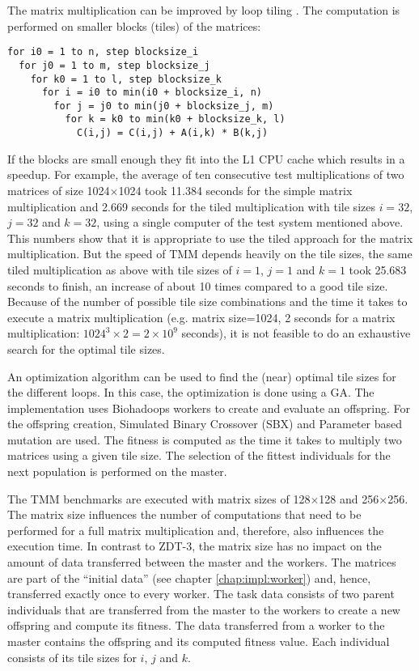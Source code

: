 The matrix multiplication can be improved by loop tiling \cite{wolfe1989more}. The computation is performed on smaller blocks (tiles) of the matrices:
\begin{lstlisting}
for i0 = 1 to n, step blocksize_i
  for j0 = 1 to m, step blocksize_j
    for k0 = 1 to l, step blocksize_k
      for i = i0 to min(i0 + blocksize_i, n)
        for j = j0 to min(j0 + blocksize_j, m)
          for k = k0 to min(k0 + blocksize_k, l)
            C(i,j) = C(i,j) + A(i,k) * B(k,j)
\end{lstlisting}

If the blocks are small enough they fit into the L1 CPU cache which results in a speedup. For example, the average of ten consecutive test multiplications of two matrices of size 1024$\times$1024 took 11.384 seconds for the simple matrix multiplication and 2.669 seconds for the tiled multiplication with tile sizes $i=32$, $j=32$ and $k=32$, using a single computer of the test system mentioned above. This numbers show that it is appropriate to use the tiled approach for the matrix multiplication. But the speed of TMM depends heavily on the tile sizes, the same tiled multiplication as above with tile sizes of $i=1$, $j=1$ and $k=1$ took 25.683 seconds to finish, an increase of about 10 times compared to a good tile size. Because of the number of possible tile size combinations and the time it takes to execute a matrix multiplication (e.g. matrix size=1024, 2 seconds for a matrix multiplication: $1024^3 \times 2 = 2\times{10^9} $ seconds), it is not feasible to do an exhaustive search for the optimal tile sizes.

An optimization algorithm can be used to find the (near) optimal tile sizes for the different loops. In this case, the optimization is done using a GA. The implementation uses Biohadoops workers to create and evaluate an offspring. For the offspring creation, Simulated Binary Crossover (SBX) and Parameter based mutation are used. The fitness is computed as the time it takes to multiply two matrices using a given tile size. The selection of the fittest individuals for the next population is performed on the master.

The TMM benchmarks are executed with matrix sizes of 128$\times$128 and 256$\times$256. The matrix size influences the number of computations that need to be performed for a full matrix multiplication and, therefore, also influences the execution time. In contrast to ZDT-3, the matrix size has no impact on the amount of data transferred between the master and the workers. The matrices are part of the ``initial data'' (see chapter \ref{chap:impl:worker}) and, hence, transferred exactly once to every worker. The task data consists of two parent individuals that are transferred from the master to the workers to create a new offspring and compute its fitness. The data transferred from a worker to the master contains the offspring and its computed fitness value. Each individual consists of its tile sizes for $i$, $j$ and $k$.

